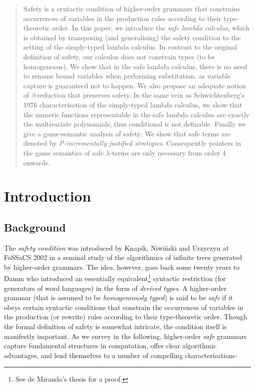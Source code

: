 \documentclass{llncs}
\begin{document}
\begin{abstract}
  Safety is a syntactic condition of higher-order grammars that
  constrains occurrences of variables in the production rules
  according to their type-theoretic order. In this paper, we introduce
  the \emph{safe lambda calculus}, which is obtained by transposing
  (and generalising) the safety condition to the setting of the
  simply-typed lambda calculus. In contrast to the original definition
  of safety, our calculus does not constrain types (to be
  homogeneous). We show that in the safe lambda calculus, there is no
  need to rename bound variables when performing substitution, as
  variable capture is guaranteed not to happen.  We also propose an
  adequate notion of $\beta$-reduction that preserves safety.  In the
  same vein as Schwichtenberg's 1976 characterisation of the
  simply-typed lambda calculus, we show that the numeric functions
  representable in the safe lambda calculus are exactly the
  multivariate polynomials; thus conditional is not definable.
  Finally we give a game-semantic analysis of safety: We show that
  safe terms are denoted by \emph{P-incrementally justified
    strategies}. Consequently pointers in the game semantics of safe
  $\lambda$-terms are only necessary from order 4 onwards.
\end{abstract}

\section{Introduction}

\subsection*{Background}

The \emph{safety condition} was introduced by Knapik, Niwi{\'n}ski and
Urzyczyn at FoSSaCS 2002 \cite{KNU02} in a seminal study of the
algorithmics of infinite trees generated by higher-order grammars. The
idea, however, goes back some twenty years to Damm \cite{Dam82} who
introduced an essentially equivalent\footnote{See de Miranda's
 thesis \cite{demirandathesis} for a proof.} syntactic
restriction (for generators of word languages) in the form of
\emph{derived types}.
A higher-order grammar (that is assumed to be \emph{homogeneously
  typed}) is said to be \emph{safe} if it obeys certain syntactic
conditions that constrain the occurrences of variables in the
production (or rewrite) rules according to their type-theoretic
order. Though the formal definition of safety is somewhat intricate,
the condition itself is manifestly important. As we survey in the
following, higher-order \emph{safe} grammars capture fundamental
structures in computation, offer clear algorithmic advantages, and
lend themselves to a number of compelling characterisations:
\end{document}
